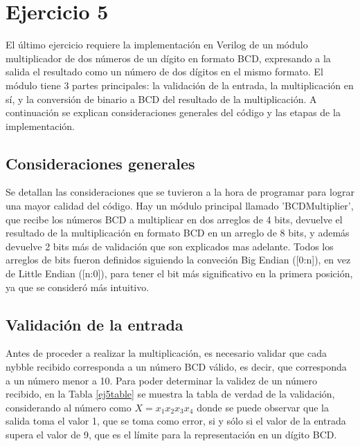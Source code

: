 \section{Ejercicio 5}

\noindent
El \'ultimo ejercicio requiere la implementaci\'on en Verilog de un m\'odulo multiplicador de dos n\'umeros de un d\'igito en formato BCD, expresando a la salida el resultado como un n\'umero de dos d\'igitos en el mismo formato. \newline
El m\'odulo tiene 3 partes principales: la validaci\'on de la entrada, la multiplicaci\'on en s\'i, y la conversi\'on de binario a BCD del resultado de la multiplicaci\'on. A continuaci\'on se explican consideraciones generales del c\'odigo y las etapas de la implementaci\'on.

\subsection{Consideraciones generales}
\noindent
Se detallan las consideraciones que se tuvieron a la hora de programar para lograr una mayor calidad del c\'odigo. 
Hay un m\'odulo principal llamado 'BCDMultiplier', que recibe los n\'umeros BCD a multiplicar en dos arreglos de 4 bits, devuelve el resultado de la multiplicaci\'on en formato BCD en un arreglo de 8 bits, y adem\'as devuelve 2 bits m\'as de validaci\'on que son explicados mas adelante.
Todos los arreglos de bits fueron definidos siguiendo la conveci\'on Big Endian ([0:n]), en vez de Little Endian ([n:0]), para tener el bit m\'as significativo en la primera posici\'on, ya que se consider\'o m\'as intuitivo. \newline



\subsection{Validaci\'on de la entrada}
\noindent
Antes de proceder a realizar la multiplicaci\'on, es necesario validar que cada nybble recibido corresponda a un n\'umero BCD v\'alido, es decir, que corresponda  a un n\'umero menor a 10. Para poder determinar la validez de un n\'umero recibido, en la Tabla \ref{ej5table} se muestra la tabla de verdad de la validaci\'on, considerando al n\'umero como $X = x_1x_2x_3x_4$ donde se puede observar que la salida toma el valor 1, que se toma como error, si y s\'olo si el valor de la entrada supera el valor de 9, que es el l\'imite para la representaci\'on en un d\'igito BCD.

